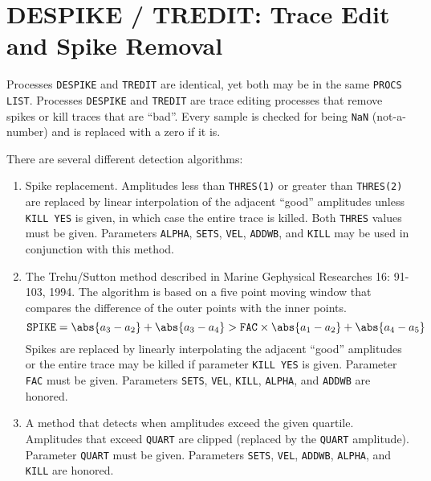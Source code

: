 \section{DESPIKE / TREDIT: Trace Edit and Spike Removal}
\label{cmd_despike}

   Processes \texttt{DESPIKE} and \texttt{TREDIT} are identical, yet both may be in
the same \texttt{PROCS LIST}.   Processes \texttt{DESPIKE} and \texttt{TREDIT} are trace
editing processes that remove spikes or kill traces that are ``bad''.
   Every sample is checked for being \texttt{NaN} (not-a-number) and is replaced
with a zero if it is.

There are several different detection algorithms:

\begin{enumerate}
\item Spike replacement.  Amplitudes less than \texttt{THRES(1)} or greater than \texttt{THRES(2)} are replaced by linear interpolation of the adjacent ``good'' amplitudes unless \texttt{KILL YES} is given, in which case the entire trace is killed.  Both \texttt{THRES} values must be given.  Parameters \texttt{ALPHA}, \texttt{SETS}, \texttt{VEL}, \texttt{ADDWB}, and \texttt{KILL} may be used in conjunction with this method.

\item The Trehu/Sutton method described in Marine Gephysical Researches
    16: 91-103, 1994. \cite{Trehu1994}  The algorithm is based on a five point moving
    window that compares the difference of the outer points with the
    inner points.
    \begin{equation}
        \texttt{SPIKE} = \abs{a_{3}-a_{2}} + \abs{a_{3}-a_{4}} > \texttt{FAC} \times \abs{a_{1}-a_{2}} + \abs{a_{4}-a_{5}}
    \end{equation}
    Spikes are replaced by linearly interpolating the adjacent
    ``good'' amplitudes or the entire trace may be killed if parameter
    \texttt{KILL YES} is given.  Parameter \texttt{FAC} must be given.  Parameters \texttt{SETS},
    \texttt{VEL}, \texttt{KILL}, \texttt{ALPHA}, and \texttt{ADDWB} are honored.

\item  A method that detects when amplitudes exceed the given quartile.
    Amplitudes that exceed \texttt{QUART} are clipped (replaced by the \texttt{QUART}
    amplitude).  Parameter \texttt{QUART} must be given.  Parameters \texttt{SETS}, \texttt{VEL},
    \texttt{ADDWB}, \texttt{ALPHA}, and \texttt{KILL} are honored.


\end{enumerate}
